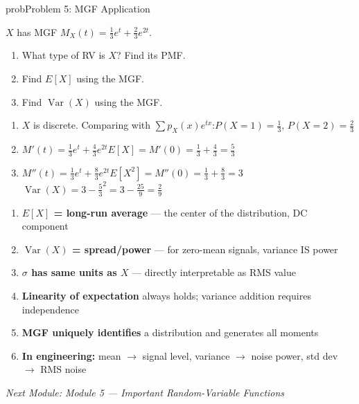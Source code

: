 \begin{PSbox}[unbreakable]{prob}{Problem 5: MGF Application}

$X$ has MGF $M_{X}(t) = \frac{1}{3}e^{t} + \frac{2}{3}e^{2t}$.

\begin{enumerate}
\def\labelenumi{(\alph{enumi})}
\tightlist
\item
  What type of RV is $X$? Find its PMF.
\item
  Find $E[X]$ using the MGF.
\item
  Find $\operatorname{Var}(X)$ using the MGF.
\end{enumerate}

\PSsolution{} 

\begin{enumerate}
\def\labelenumi{(\alph{enumi})}
\item
  $X$ is discrete. Comparing with $\sum p_{X}(x)e^{tx}$:\PSbr{}$\displaystyle P(X = 1) = \frac{1}{3},\, P(X = 2) = \frac{2}{3}$
\item
  $\displaystyle M'(t) = \frac{1}{3}e^{t} + \frac{4}{3}e^{2t}$\PSbr{}$\displaystyle E[X] = M'(0) = \frac{1}{3} + \frac{4}{3} = \frac{5}{3}$
\item
  $\displaystyle M''(t) = \frac{1}{3}e^{t} + \frac{8}{3}e^{2t}$\PSbr{}$\displaystyle E[X^{2}] = M''(0) = \frac{1}{3} + \frac{8}{3} = 3$\PSbr{}$\displaystyle \operatorname{Var}(X) = 3 - \frac{5}{3}^{2} = 3 - \frac{25}{9} = \frac{2}{9}$
\end{enumerate}

\end{PSbox}


\begin{enumerate}
\def\labelenumi{\arabic{enumi}.}
\tightlist
\item
  \textbf{$E[X]$ = long-run average} — the center of the distribution, DC component
\item
  \textbf{$\operatorname{Var}(X)$ = spread/power} — for zero-mean signals, variance IS power
\item
  \textbf{$\sigma$ has same units as $X$} — directly interpretable as RMS value
\item
  \textbf{Linearity of expectation} always holds; variance addition requires independence
\item
  \textbf{MGF uniquely identifies} a distribution and generates all moments
\item
  \textbf{In engineering:} mean \ensuremath{\to} signal level, variance \ensuremath{\to} noise power, std dev \ensuremath{\to} RMS noise
\end{enumerate}

\emph{Next Module: {Module 5 — Important Random-Variable Functions}}
